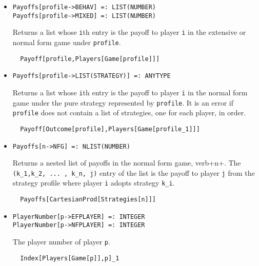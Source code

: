 \begin{itemize}
\item{}
\protect \large \begin{verbatim}
Payoffs[profile->BEHAV] =: LIST(NUMBER) 
Payoffs[profile->MIXED] =: LIST(NUMBER) 
\end{verbatim}\normalsize

\bd 
Returns a list whose \verb+i+th entry is the payoff to player \verb+i+
in the extensive or normal form game under \verb+profile+.
\begin{verbatim}
  Payoff[profile,Players[Game[profile]]]
\end{verbatim} 
\ed

\item{}
\protect \large \begin{verbatim}
Payoffs[profile->LIST(STRATEGY)] =: ANYTYPE 
\end{verbatim}\normalsize

\bd 
Returns a list whose \verb+i+th entry is the payoff to player \verb+i+
in the normal form game under the pure strategy represented by \verb+profile+.
It is an error if \verb+profile+ does not contain a list of
strategies, one for each player, in order.  
\begin{verbatim}
  Payoff[Outcome[profile],Players[Game[profile_1]]]
\end{verbatim} 
\ed


\item{}
\protect \large \begin{verbatim}
Payoffs[n->NFG] =: NLIST(NUMBER) 
\end{verbatim}\normalsize

\bd 
Returns a nested list of payoffs in the normal form game, verb+n+.
The \verb+(k_1,k_2, ... , k_n, j)+ entry of the list is the payoff to
player \verb+j+ from the strategy profile where player \verb+i+ adopts
strategy \verb+k_i+.
\begin{verbatim}
  Payoffs[CartesianProd[Strategies[n]]]
\end{verbatim} 
\ed
  

\item{}
\protect \large \begin{verbatim}
PlayerNumber[p->EFPLAYER] =: INTEGER 
PlayerNumber[p->NFPLAYER] =: INTEGER 
\end{verbatim}\normalsize

\bd 
The player number of player \verb+p+.
\begin{verbatim}
  Index[Players[Game[p]],p]_1
\end{verbatim} 
\ed


\end{itemize}

